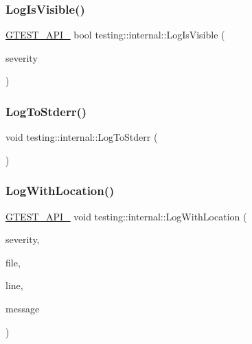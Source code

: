 \subsubsection{\texorpdfstring{Log\+Is\+Visible()}{LogIsVisible()}}
{\footnotesize\ttfamily \hyperlink{gtest-port_8h_aa73be6f0ba4a7456180a94904ce17790}{G\+T\+E\+S\+T\+\_\+\+A\+P\+I\+\_\+} bool testing\+::internal\+::\+Log\+Is\+Visible (\begin{DoxyParamCaption}\item[{\hyperlink{namespacetesting_1_1internal_a203d1a8a2147a53d12bbdae40d443914}{Log\+Severity}}]{severity }\end{DoxyParamCaption})}

\mbox{\label{namespacetesting_1_1internal_a06b1b20029fbd1dbeb59752f914fab84}} 
\subsubsection{\texorpdfstring{Log\+To\+Stderr()}{LogToStderr()}}
{\footnotesize\ttfamily void testing\+::internal\+::\+Log\+To\+Stderr (\begin{DoxyParamCaption}{ }\end{DoxyParamCaption})\hspace{0.3cm}{\ttfamily [inline]}}

\mbox{\label{namespacetesting_1_1internal_af271cd1fc0b62a7f4736cb3109e86a37}} 
\subsubsection{\texorpdfstring{Log\+With\+Location()}{LogWithLocation()}}
{\footnotesize\ttfamily \hyperlink{gtest-port_8h_aa73be6f0ba4a7456180a94904ce17790}{G\+T\+E\+S\+T\+\_\+\+A\+P\+I\+\_\+} void testing\+::internal\+::\+Log\+With\+Location (\begin{DoxyParamCaption}\item[{\hyperlink{namespacetesting_1_1internal_a203d1a8a2147a53d12bbdae40d443914}{testing\+::internal\+::\+Log\+Severity}}]{severity,  }\item[{const char $\ast$}]{file,  }\item[{int}]{line,  }\item[{const \hyperlink{namespacetesting_1_1internal_a8e8ff5b11e64078831112677156cb111}{string} \&}]{message }\end{DoxyParamCaption})}

